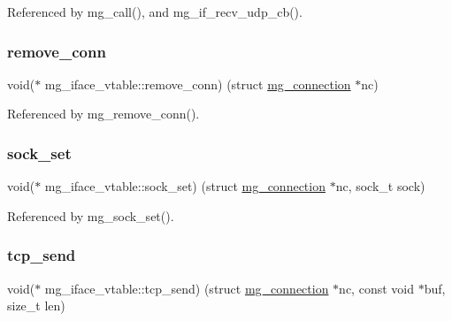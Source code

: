 Referenced by mg\+\_\+call(), and mg\+\_\+if\+\_\+recv\+\_\+udp\+\_\+cb().

\mbox{\label{structmg__iface__vtable_a3b76727f620579f2e5b2b18c346e71b4_a3b76727f620579f2e5b2b18c346e71b4}} 
\subsubsection{\texorpdfstring{remove\+\_\+conn}{remove\_conn}}
{\footnotesize\ttfamily void($\ast$ mg\+\_\+iface\+\_\+vtable\+::remove\+\_\+conn) (struct \hyperlink{structmg__connection}{mg\+\_\+connection} $\ast$nc)}



Referenced by mg\+\_\+remove\+\_\+conn().

\mbox{\label{structmg__iface__vtable_a1cca4d335d41b5f40573a657fa022575_a1cca4d335d41b5f40573a657fa022575}} 
\subsubsection{\texorpdfstring{sock\+\_\+set}{sock\_set}}
{\footnotesize\ttfamily void($\ast$ mg\+\_\+iface\+\_\+vtable\+::sock\+\_\+set) (struct \hyperlink{structmg__connection}{mg\+\_\+connection} $\ast$nc, sock\+\_\+t sock)}



Referenced by mg\+\_\+sock\+\_\+set().

\mbox{\label{structmg__iface__vtable_a73eaa7dd92a2be5503f947972deb3e2c_a73eaa7dd92a2be5503f947972deb3e2c}} 
\subsubsection{\texorpdfstring{tcp\+\_\+send}{tcp\_send}}
{\footnotesize\ttfamily void($\ast$ mg\+\_\+iface\+\_\+vtable\+::tcp\+\_\+send) (struct \hyperlink{structmg__connection}{mg\+\_\+connection} $\ast$nc, const void $\ast$buf, size\+\_\+t len)}



